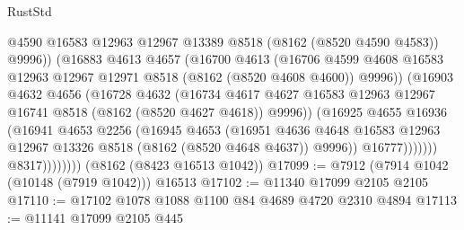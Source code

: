\begin{lexlean}{RustStd}
\begin{coremodule}
                              @4590
                              @16583
                              @12963
                              @12967
                              @13389
                              @8518
                              (@8162 (@8520 @4590 @4583))
                              @9996))
                          (@16883
                            @4613
                            @4657
                            (@16700
                              @4613
                              (@16706
                                @4599
                                @4608
                                @16583
                                @12963
                                @12967
                                @12971
                                @8518
                                (@8162 (@8520 @4608 @4600))
                                @9996))
                            (@16903
                              @4632
                              @4656
                              (@16728
                                @4632
                                (@16734
                                  @4617
                                  @4627
                                  @16583
                                  @12963
                                  @12967
                                  @16741
                                  @8518
                                  (@8162 (@8520 @4627 @4618))
                                  @9996))
                              (@16925
                                @4655
                                @16936
                                (@16941
                                  @4653
                                  @2256
                                  (@16945
                                    @4653
                                    (@16951
                                      @4636
                                      @4648
                                      @16583
                                      @12963
                                      @12967
                                      @13326
                                      @8518
                                      (@8162 (@8520 @4648 @4637))
                                      @9996))
                                  @16777)))))))
                    @8317))))))))
    (@8162 (@8423 @16513 @1042))
@17099 := @7912 (@7914 @1042 (@10148 (@7919 @1042))) @16513
@17102 := @11340 @17099 @2105 @2105
@17110 := @17102 @1078 @1088 @1100 @84 @4689 @4720 @2310 @4894
@17113 := @11141 @17099 @2105 @445

\end{coremodule}
\end{lexlean}
